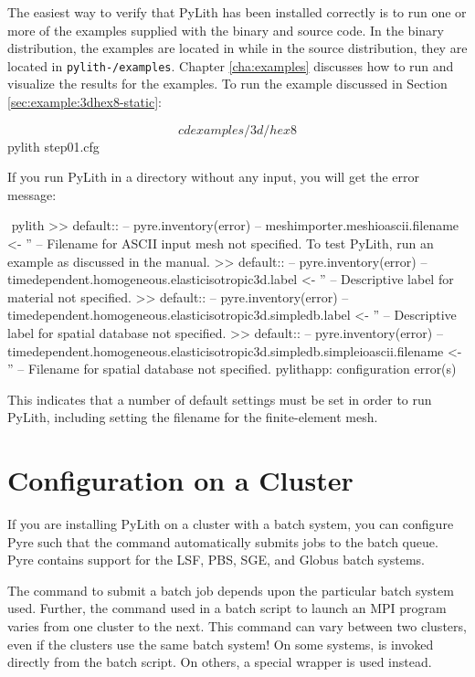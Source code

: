 The easiest way to verify that PyLith has been installed correctly is
to run one or more of the examples supplied with the binary and source
code. In the binary distribution, the examples are located in
 while in the source distribution,
they are located in \texttt{pylith-\pylithVersionNumber/examples}. Chapter
\vref{cha:examples} discusses how to run and visualize the results
for the examples. To run the example discussed in Section
\vref{sec:example:3dhex8-static}:
\begin{shell}
$$ cd examples/3d/hex8
$$ pylith step01.cfg
\end{shell}
If you run PyLith in a directory without any input, you will get the
error message:
\begin{shell}
$$ pylith
 >> {default}::
 -- pyre.inventory(error)
 -- meshimporter.meshioascii.filename <- ''
 -- Filename for ASCII input mesh not specified.
    To test PyLith, run an example as discussed in the manual.
 >> {default}::
 -- pyre.inventory(error)
 -- timedependent.homogeneous.elasticisotropic3d.label <- ''
 -- Descriptive label for material not specified.
 >> {default}::
 -- pyre.inventory(error)
 -- timedependent.homogeneous.elasticisotropic3d.simpledb.label <- ''
 -- Descriptive label for spatial database not specified.
 >> {default}::
 -- pyre.inventory(error)
 -- timedependent.homogeneous.elasticisotropic3d.simpledb.simpleioascii.filename <- ''
 -- Filename for spatial database not specified.
pylithapp: configuration error(s)
\end{shell}
This indicates that a number of default settings must be set in order
to run PyLith, including setting the filename for the finite-element
mesh.


\section{Configuration on a Cluster}

If you are installing PyLith on a cluster with a batch system, you can
configure Pyre such that the  command automatically
submits jobs to the batch queue. Pyre contains support for the LSF,
PBS, SGE, and Globus batch systems.

The command to submit a batch job depends upon the particular batch
system used. Further, the command used in a batch script to launch an
MPI program varies from one cluster to the next. This command can vary
between two clusters, even if the clusters use the same batch system!
On some systems,  is invoked directly from the batch
script. On others, a special wrapper is used instead.

